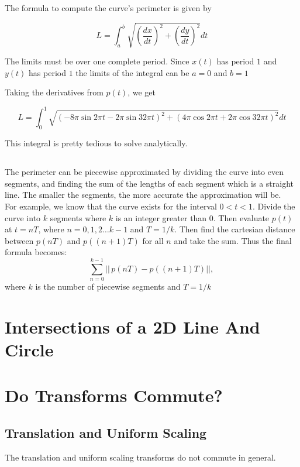 \documentclass[a4paper,10pt]{scrartcl}
\begin{document}
The formula to compute the curve's perimeter is given by

\[ L = \int_{a}^{b} \sqrt{\left( \frac{dx}{dt}\right)^2 + \left( \frac{dy}{dt}\right)^2}dt\]

The limits must be over one complete period. Since $x(t)$ has period $1$ and $y(t)$ has period $1$ the limits of the integral can be $a=0$ and $b=1$

Taking the derivatives from $p(t)$, we get

\[ L = \int_{0}^{1} \sqrt{\left( -8\pi\sin{2\pi t} - 2\pi\sin{32\pi t} \right)^2 + \left( 4\pi\cos{2\pi t} + 2\pi\cos{32\pi t}\right)^2}dt\]

This integral is pretty tedious to solve analytically.

\subsection{}

The perimeter can be piecewise approximated by dividing the curve into even segments,
and finding the sum of the lengths of each segment which is a straight line. The smaller the segments,
the more accurate the approximation will be.\\

For example, we know that the curve exists for the interval $0 < t < 1$. Divide the curve into $k$ segments where $k$ is an integer greater than 0.
Then evaluate $p(t)$ at $t = nT$, where $n = 0,1,2 \ldots k-1$ and $T = 1/k$. Then find the cartesian distance between
$p(nT)$ and $p((n+1)T)$ for all $n$ and take the sum. Thus the final formula becomes:\\
\[
\sum_{n=0}^{k-1}
  ||\,p(nT) - p((n+1)T)||,\,\] where $k$ is the number of piecewise segments and $T = 1/k$

\section{Intersections of a 2D Line And Circle}

\section{Do Transforms Commute?}

\subsection{Translation and Uniform Scaling}

The translation and uniform scaling transforms do not commute in general.
\end{document}
